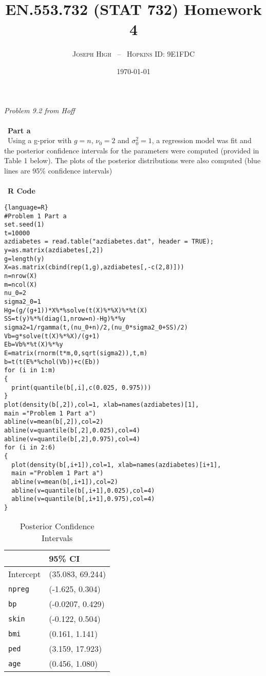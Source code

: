 \documentclass[12pt]{article}
\newenvironment{problem}[2][Problem]{\begin{trivlist}
\item[\hskip \labelsep {\bfseries #1}\hskip \labelsep {\bfseries #2.}]}{\end{trivlist}}
\begin{document}
\title{\textsc{EN.553.732 (STAT 732)} Homework 4}
\author{\textsc{Joseph High} \ -- \ \textsc{Hopkins ID: 9E1FDC}}
\date{\today}
\maketitle

\begin{problem}{1} \textit{Problem 9.2 from Hoff}
\\\
\\\
\textbf{Part a} 
\\\
Using a g-prior with $g=n$, $\nu_0=2$ and $\sigma_0^2=1$, a regression model was fit and the posterior confidence intervals for the parameters were computed (provided in Table 1 below). The plots of the posterior distributions were also computed (blue lines are 95\% confidence intervals) 
\\\
\\\
\textbf{R Code} 
\begin{lstlisting}{language=R}
#Problem 1 Part a
set.seed(1)
t=10000
azdiabetes = read.table("azdiabetes.dat", header = TRUE);
y=as.matrix(azdiabetes[,2])
g=length(y)
X=as.matrix(cbind(rep(1,g),azdiabetes[,-c(2,8)]))
n=nrow(X)
m=ncol(X)
nu_0=2
sigma2_0=1
Hg=(g/(g+1))*X%*%solve(t(X)%*%X)%*%t(X)
SS=t(y)%*%(diag(1,nrow=n)-Hg)%*%y
sigma2=1/rgamma(t,(nu_0+n)/2,(nu_0*sigma2_0+SS)/2)
Vb=g*solve(t(X)%*%X)/(g+1)
Eb=Vb%*%t(X)%*%y
E=matrix(rnorm(t*m,0,sqrt(sigma2)),t,m)
b=t(t(E%*%chol(Vb))+c(Eb))
for (i in 1:m) 
{
  print(quantile(b[,i],c(0.025, 0.975)))
}         
plot(density(b[,2]),col=1, xlab=names(azdiabetes)[1], 
main ="Problem 1 Part a")
abline(v=mean(b[,2]),col=2)
abline(v=quantile(b[,2],0.025),col=4)
abline(v=quantile(b[,2],0.975),col=4)
for (i in 2:6) 
{
  plot(density(b[,i+1]),col=1, xlab=names(azdiabetes)[i+1], 
  main ="Problem 1 Part a")
  abline(v=mean(b[,i+1]),col=2)
  abline(v=quantile(b[,i+1],0.025),col=4)
  abline(v=quantile(b[,i+1],0.975),col=4)
}
\end{lstlisting}

\begin{table}[h]
\centering
\caption{Posterior Confidence Intervals}
\label{my-label}
\begin{tabular}{|l|l|}
\hline
& 95\% CI \\ \hline
Intercept & (35.083, 69.244)    \\ \hline
\texttt{npreg}       & (-1.625, 0.304)  \\ \hline
\texttt{bp}          & (-0.0207, 0.429) \\ \hline
\texttt{skin}        & (-0.122, 0.504)  \\ \hline
\texttt{bmi}         & (0.161, 1.141)  \\ \hline
\texttt{ped}         & (3.159, 17.923)  \\ \hline
\texttt{age}         & (0.456, 1.080)  \\ \hline
\end{tabular}
\end{table}


\end{problem}
\end{document}
